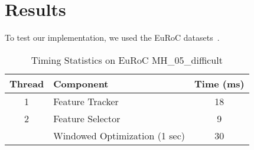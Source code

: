
\section{Results}\label{sec:results}

To test our implementation, we used the EuRoC datasets~\cite{Burri2016}.


\begin{table}[h]
    \centering
    \caption{Timing Statistics on EuRoC MH\_05\_difficult}
    \begin{tabular}{clc}
        \toprule
        Thread & Component & Time (ms) \\
        \midrule
        1 & Feature Tracker & 18 \\
        \midrule
        2 & Feature Selector & 9 \\
          & Windowed Optimization (1 sec) & 30 \\
        \bottomrule
    \end{tabular}
    \label{tab:timing}
\end{table}
